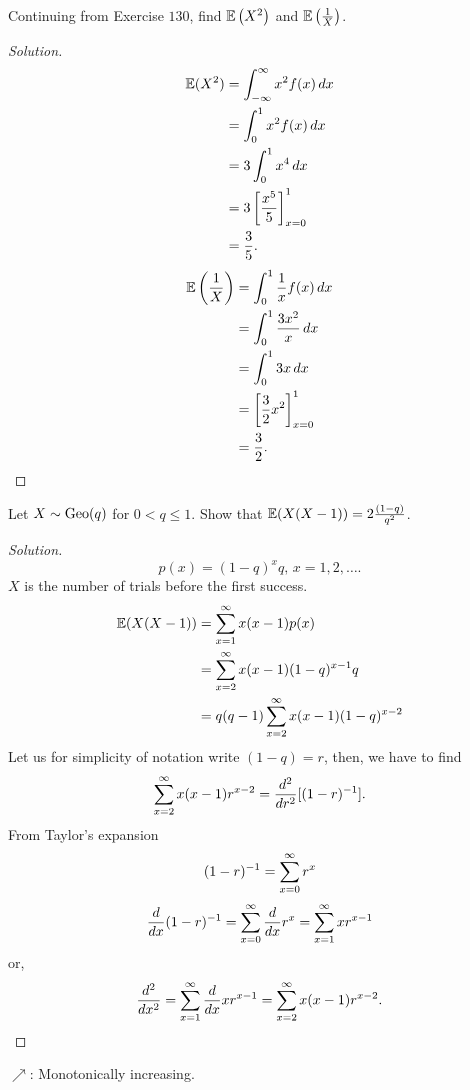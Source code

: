 \documentclass[10pt, a4paper]{article}
\begin{document}
\begin{problem}[137]
    Continuing from Exercise $130$,
    find $\E\left(X ^ 2\right)$ and $\E\left(\frac{1}{X}\right)$.
    \begin{proof}[Solution]\renewcommand{\qedsymbol}{}
        \begin{align*}
            \E(X ^ 2) &= \int_{-\infty}^{\infty}x ^ 2f(x)\,dx \\
            &= \int_{0}^{1}x ^ 2f(x)\,dx \\
            &= 3\int_{0}^{1}x ^ 4\,dx \\
            &= 3\left[\frac{x ^ 5}{5}\right]_{x = 0}^{1} \\
            &= \frac{3}{5}.
        \end{align*}
        \begin{align*}
            \E\left(\frac{1}{X}\right) &= \int_{0}^{1}\frac{1}{x}f(x)\,dx \\
            &= \int_{0}^{1}\frac{3x ^ 2}{x}\,dx \\
            &= \int_{0}^{1}3x\,dx \\
            &= \left[\frac{3}{2}x ^ 2\right]_{x = 0}^{1} \\
            &= \frac{3}{2}. \\
        \end{align*}
    \end{proof}
\end{problem}

\begin{problem}
    Let $X \sim \Geo(q)$ for $0 < q \leq 1$.
    Show that $\E(X(X - 1)) = 2\frac{(1 - q)}{q ^ 2}$.

    \begin{proof}[Solution]\renewcommand{\qedsymbol}{}
        \[
        p(x) = (1 - q) ^ xq,\,x = 1, 2, \dotsc.
        \]
        $X$ is the number of trials before the first success.
        \begin{align*}
            \E(X(X - 1)) &= \infsum[x = 1]x(x - 1)p(x) \\
            &= \infsum[x = 2]x(x - 1)(1 - q) ^ {x - 1}q \\
            &= q(q - 1)\infsum[x = 2]x(x - 1)(1 - q) ^ {x - 2}
        \end{align*}
        Let us for simplicity of notation write $(1 - q) = r$,
        then,
        we have to find
        \[
        \infsum[x = 2]x(x - 1)r ^ {x - 2} = \frac{d ^ 2}{dr ^ 2}[(1 - r) ^ {-1}].
        \]
        From Taylor's expansion
        \[
        (1 - r) ^ {-1} = \infsum[x = 0]r ^ x
        \]
        \[
        \frac{d}{dx}(1 - r) ^ {-1} = \infsum[x = 0]\frac{d}{dx}r ^ x = \infsum[x = 1]xr ^ {x - 1}
        \]
        or,
        \[
        \frac{d ^ 2}{dx ^ 2} = \infsum[x = 1]\frac{d}{dx}xr ^ {x - 1} = \infsum[x = 2]x(x - 1)r ^ {x - 2}.
        \]
    \end{proof}
\end{problem}

\newpage

$\nearrow$: Monotonically increasing.
\end{document}
